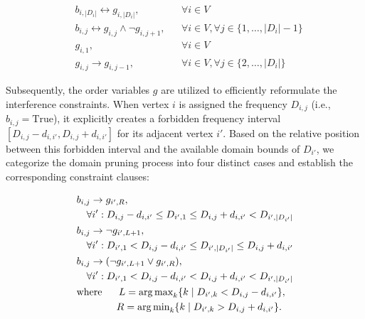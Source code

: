 \documentclass[letterpaper,journal]{IEEEtran}
\begin{document}
\begin{align}
    & b_{i,|D_i|} \leftrightarrow g_{i,|D_i|}, && \forall i \in V \label{eq:g_right_bound}\\
    & b_{i,j} \leftrightarrow g_{i,j} \wedge \neg g_{i,j+1}, && \forall i \in V, \forall j \in \{1, \dots, |D_i|-1\} \label{eq:g_b_connect}\\
    & g_{i,1}, && \forall i \in V \label{eq:g_left_bound}\\
    & g_{i,j} \rightarrow g_{i,j-1}, && \forall i \in V, \forall j \in \{2, \dots, |D_i|\} \label{eq:g_propagation}
\end{align}

Subsequently, the order variables $g$ are utilized to efficiently reformulate the interference constraints. When vertex $i$ is assigned the frequency $D_{i,j}$ (i.e., $b_{i,j} = \text{True}$), it explicitly creates a forbidden frequency interval $[D_{i,j} - d_{i,i'}, D_{i,j} + d_{i,i'}]$ for its adjacent vertex $i'$. Based on the relative position between this forbidden interval and the available domain bounds of $D_{i'}$, we categorize the domain pruning process into four distinct cases and establish the corresponding constraint clauses:

\begin{align}
    & b_{i,j} \rightarrow g_{i',R}, \notag\\
    & \quad \forall i': D_{i,j} - d_{i,i'} \le D_{i',1} \le D_{i,j} + d_{i,i'} < D_{i',|D_{i'}|} \label{eq:forbid_1} \\
    & b_{i,j} \rightarrow \neg g_{i',L+1}, \notag\\
    & \quad \forall i': D_{i',1} < D_{i,j} - d_{i,i'} \le D_{i',|D_{i'}|} \le D_{i,j} + d_{i,i'} \label{eq:forbid_2} \\
    & b_{i,j} \rightarrow (\neg g_{i',L+1} \lor g_{i',R}), \notag\\
    & \quad \forall i': D_{i',1} < D_{i,j} - d_{i,i'} < D_{i,j} + d_{i,i'} < D_{i',|D_{i'}|} \label{eq:forbid_3}  \\
    & \text{where } \ \quad L = \operatorname{arg\,max}\limits_{k} \{ k \mid D_{i',k} < D_{i,j} - d_{i,i'} \}, \label{eq:forbid_L}\\
    & \quad \quad \quad  \quad R = \operatorname{arg\,min}\limits_{k} \{ k \mid D_{i',k} > D_{i,j} + d_{i,i'} \}. \label{eq:forbid_R}
\end{align}
\end{document}
